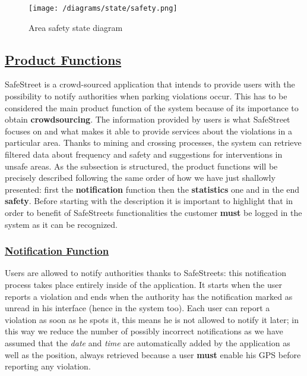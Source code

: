 			\vspace{0.3cm}
			\begin{figure}[h]
				\centering
				\texttt{[image: /diagrams/state/safety.png]}
				\caption{\label{fig:safetyState}Area safety state diagram}
			\end{figure}   

\subsection[Product Functions]{\hyperlink{toc}{Product Functions}}
	\label{sec:productFunctions}
	SafeStreet is a crowd-sourced application that intends to provide users with the possibility to notify authorities when parking violations occur. This has to be considered the main product function of the system because of its importance to obtain \textbf{crowdsourcing}. The information provided by users is what SafeStreet focuses on and what makes it able to provide services about the violations in a particular area. Thanks to mining and crossing processes, the system can retrieve filtered data about frequency and safety and suggestions for interventions in unsafe areas. As the subsection is structured, the product functions will be precisely described following the same order of how we have just shallowly presented: first the \textbf{notification} function then the \textbf{statistics} one and in the end \textbf{safety}. Before starting with the description it is important to highlight that in order to benefit of SafeStreets functionalities the customer \textbf{must} be logged in the system as it can be recognized.
	
	\subsubsection[Notification Function]{\hyperlink{toc}{Notification Function}}
		\label{sec:notificationFunction}
		Users are allowed to notify authorities thanks to SafeStreets: this notification process takes place entirely inside of the application. It starts when the user reports a violation and ends when the authority has the notification marked as unread in his interface (hence in the system too). Each user can report a violation as soon as he spots it, this means he is not allowed to notify it later; in this way we reduce the number of possibly incorrect notifications as we have assumed that the \emph{date} and \emph{time} are automatically added by the application as well as the position, always retrieved because a user \textbf{must} enable his GPS before reporting any violation.\\ %
		
